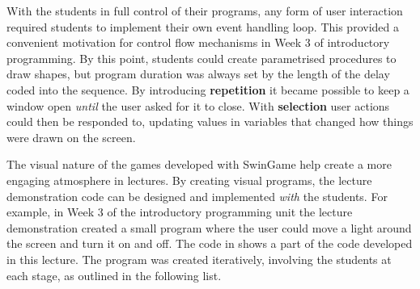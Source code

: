 With the students in full control of their programs, any form of user interaction required students to implement their own event handling loop. This provided a convenient motivation for control flow mechanisms in Week 3 of introductory programming. By this point, students could create parametrised procedures to draw shapes, but program duration was always set by the length of the delay coded into the sequence. By introducing \textbf{repetition} it became possible to keep a window open \emph{until} the user asked for it to close. With \textbf{selection} user actions could then be responded to, updating values in variables that changed how things were drawn on the screen.

The visual nature of the games developed with SwinGame help create a more engaging atmosphere in lectures. By creating visual programs, the lecture demonstration code can be designed and implemented \emph{with} the students. For example, in Week 3 of the introductory programming unit the lecture demonstration created a small program where the user could move a light around the screen and turn it on and off. The code in  shows a part of the code developed in this lecture. The program was created iteratively, involving the students at each stage, as outlined in the following list.

